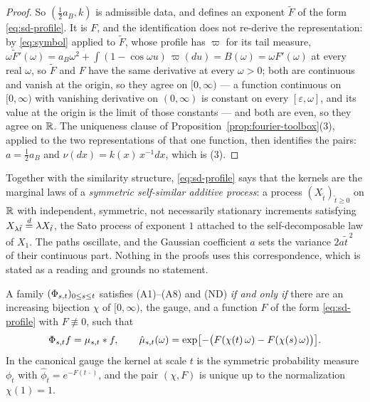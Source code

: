 \begin{proof}
So $(\tfrac12 a_B, k)$ is admissible data, and defines an exponent $\tilde F$ of the form
\ref{eq:sd-profile}. It is $F$, and the identification does not re-derive the representation:
by \ref{eq:symbol} applied to $\tilde F$, whose profile has $\varpi$ for its tail measure,
$\omega\tilde F'(\omega) = a_B\omega^2 + \int (1 - \cos\omega u)\,\varpi(du) = B(\omega)
 = \omega F'(\omega)$ at every real $\omega$, so $\tilde F$ and $F$ have the same derivative at
every $\omega > 0$; both are continuous and vanish at the origin, so they agree on $[0,\infty)$
--- a function continuous on $[0,\infty)$ with vanishing derivative on $(0,\infty)$ is constant
on every $[\varepsilon, \omega]$, and its value at the origin is the limit of those constants
--- and both are even, so they agree on $\mathbb{R}$. The uniqueness clause of
Proposition~\ref{prop:fourier-toolbox}(3), applied to the two representations of that one
function, then identifies the pairs: $a = \tfrac12 a_B$ and $\nu(dx) = k(x)\,x^{-1}dx$, which
is (3).
\end{proof}

\begin{remark}\label{rem:sato-process}
Together with the similarity structure, \ref{eq:sd-profile} says that the kernels are the
marginal laws of a \emph{symmetric self-similar additive process}: a process
$(X_{\tilde t})_{\tilde t \ge 0}$ on $\mathbb{R}$ with independent, symmetric, not necessarily
stationary increments satisfying $X_{\lambda\tilde t} \stackrel{d}{=} \lambda X_{\tilde t}$, the Sato process of
exponent $1$ attached to the self-decomposable law of $X_1$. The paths oscillate, and the
Gaussian coefficient $a$ sets the variance $2a\tilde t^{\,2}$ of their continuous part. Nothing in the proofs uses this
correspondence, which is stated as a reading and grounds no statement.
\end{remark}

\begin{theorem}\label{thm:main-characterization}
A family $(\Phi_{s,t})_{0 \le s \le t}$ satisfies (A1)--(A8) and (ND) \emph{if and only if}
there are an increasing bijection $\chi$ of $[0,\infty)$, the gauge, and a function $F$ of the
form \ref{eq:sd-profile} with $F \not\equiv 0$, such that
\[
  \Phi_{s,t} f = \mu_{s,t} * f, \qquad
  \hat\mu_{s,t}(\omega) = \exp\bigl[-\bigl(F(\chi(t)\,\omega) - F(\chi(s)\,\omega)\bigr)\bigr].
\]
In the canonical gauge the kernel at scale $t$ is the symmetric probability measure $\phi_t$
with $\hat\phi_t = e^{-F(t\,\cdot)}$, and the pair $(\chi,F)$ is unique up to the normalization
$\chi(1) = 1$.
\end{theorem}

